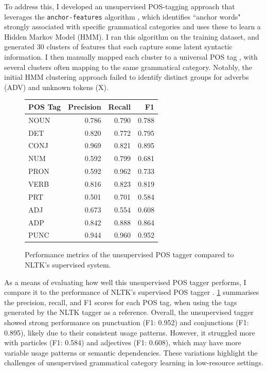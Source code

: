 To address this, I developed an unsupervised POS-tagging approach that leverages the \texttt{anchor-features} algorithm \citep{stratos2016unsupervisedpos}, which identifies ``anchor words" strongly associated with specific grammatical categories and uses these to learn a Hidden Markov Model (HMM). I ran this algorithm on the training dataset, and generated 30 clusters of features that each capture some latent syntactic information. I then manually mapped each cluster to a universal POS tag \citep{petrov2012universalpos}, with several clusters often mapping to the same grammatical category. Notably, the initial HMM clustering approach failed to identify distinct groups for adverbs (ADV) and unknown tokens (X). 

\begin{figure}
    \centering
    \small
    \begin{tabular}{lrrr}
    \toprule
    POS Tag & Precision & Recall & F1 \\
    \midrule
    NOUN & 0.786 & 0.790 & 0.788 \\
    DET & 0.820 & 0.772 & 0.795 \\
    CONJ & 0.969 & 0.821 & 0.895 \\
    NUM & 0.592 & 0.799 & 0.681 \\
    PRON & 0.592 & 0.962 & 0.733 \\   
    VERB & 0.816 & 0.823 & 0.819 \\
    PRT & 0.501 & 0.701 & 0.584 \\
    ADJ & 0.673 & 0.554 & 0.608 \\
    ADP & 0.842 & 0.888 & 0.864 \\
    PUNC & 0.944 & 0.960 & 0.952 \\
    \bottomrule
    \end{tabular}
    \caption{\label{tbl:unsupervised-pos-performance} Performance metrics of the unsupervised POS tagger compared to NLTK's supervised system.}
    \label{fig:unsupervised-pos-performance}
\end{figure}

As a means of evaluating how well this unsupervised POS tagger performs, I compare it to the performance of NLTK's supervised POS tagger \citep{bird2009natural}. \cref{fig:unsupervised-pos-performance} summarises the precision, recall, and F1 scores for each POS tag, when using the tags generated by the NLTK tagger as a reference. Overall, the unsupervised tagger showed strong performance on punctuation (F1: 0.952) and conjunctions (F1: 0.895), likely due to their consistent usage patterns. However, it struggled more with particles (F1: 0.584) and adjectives (F1: 0.608), which may have more variable usage patterns or semantic dependencies. These variations highlight the challenges of unsupervised grammatical category learning in low-resource settings.

